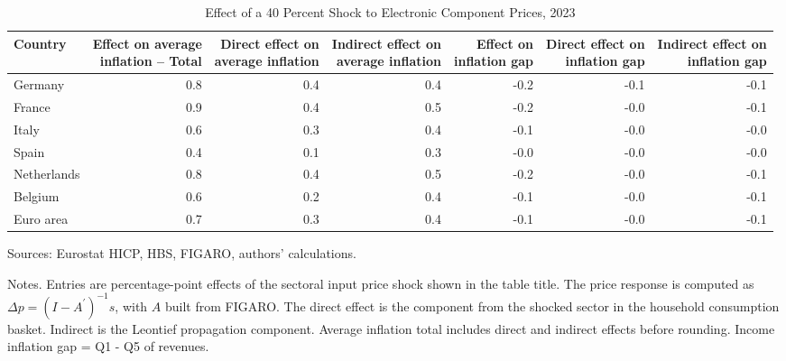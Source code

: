 \begin{table}[H]
\centering
\caption{Effect of a 40 Percent Shock to Electronic Component Prices, 2023}
\scriptsize
\setlength{\tabcolsep}{4.2pt}
\begin{tabular}{lrrrrrr}
\toprule
Country & \shortstack{Effect on average\\inflation -- Total} & \shortstack{Direct effect on\\average inflation} & \shortstack{Indirect effect on\\average inflation} & \shortstack{Effect on\\inflation gap} & \shortstack{Direct effect on\\inflation gap} & \shortstack{Indirect effect on\\inflation gap}
 \\
\midrule
Germany & 0.8 & 0.4 & 0.4 & -0.2 & -0.1 & -0.1
 \\
France & 0.9 & 0.4 & 0.5 & -0.2 & -0.0 & -0.1
 \\
Italy & 0.6 & 0.3 & 0.4 & -0.1 & -0.0 & -0.0
 \\
Spain & 0.4 & 0.1 & 0.3 & -0.0 & -0.0 & -0.0
 \\
Netherlands & 0.8 & 0.4 & 0.5 & -0.2 & -0.0 & -0.1
 \\
Belgium & 0.6 & 0.2 & 0.4 & -0.1 & -0.0 & -0.1
 \\
Euro area & 0.7 & 0.3 & 0.4 & -0.1 & -0.0 & -0.1
 \\
\bottomrule
\end{tabular}
\par\vspace{0.35em}\footnotesize\noindent Sources: Eurostat HICP, HBS, FIGARO, authors' calculations.
\par\vspace{0.25em}\footnotesize\noindent Notes. Entries are percentage-point effects of the sectoral input price shock shown in the table title. The price response is computed as $\Delta p = (I - A^{\prime})^{-1}s$, with $A$ built from FIGARO. The direct effect is the component from the shocked sector in the household consumption basket. Indirect is the Leontief propagation component. Average inflation total includes direct and indirect effects before rounding. Income inflation gap = Q1 - Q5 of revenues.
\end{table}
\vspace{0.6em}
